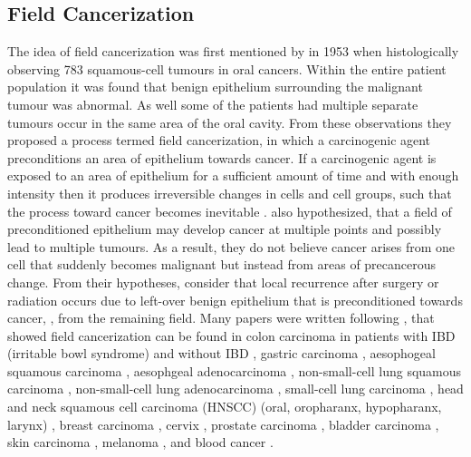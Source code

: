 \documentclass[\main/thesis.tex]{subfiles}
\begin{document}
 
\subsection{Field Cancerization}
 
The idea of field cancerization was first mentioned by \textcite{Slaughter} in 1953 when histologically observing 783 squamous-cell tumours in oral cancers. Within the entire patient population it was found that benign epithelium surrounding the malignant tumour was abnormal. As well some of the patients had multiple separate tumours occur in the same area of the oral cavity. From these observations they proposed a process termed field cancerization, in which a carcinogenic agent preconditions an area of epithelium towards cancer. If a carcinogenic agent is exposed to an area of epithelium for a sufficient amount of time and with enough intensity then it produces irreversible changes in cells and cell groups, such that the process toward cancer becomes inevitable \parencite{Slaughter}. \textcite{Slaughter} also hypothesized, that a field of preconditioned epithelium may develop cancer at multiple points and possibly lead to multiple tumours. As a result, they do not believe cancer arises from one cell that suddenly becomes malignant but instead from areas of precancerous change. From their hypotheses, \textcite{Slaughter} consider that local recurrence after surgery or radiation occurs due to left-over benign epithelium that is preconditioned towards cancer, \ie, from the remaining field. Many papers were written following \textcite{Slaughter}, that showed field cancerization can be found in colon carcinoma in patients with \parencite{Galandiuk,Leedham,Koizumi,VanDekken2006} IBD (irritable bowl syndrome) and without IBD \parencite{Alonso,Asada,Damania,Hawthorn,Kamiyama,Kaz,Milicic,Shen}, gastric carcinoma \parencite{GutierrezGonzalez,Kang,McDonald,Takeshima,Ushijima,Yamanoi,Zaky}, aesophogeal squamous carcinoma \parencite{Cense,Kammori,Lee,Matsuda,Oka,RoeschEly,Yakoub}, aesophgeal adenocarcinoma \parencite{Galipeau,Maley052004,Maley102004,VanDekken1999}, non-small-cell lung squamous carcinoma \parencite{Chang,Franklin,Kadara2012,McCaughan,Pipinikas,Sozzi,Steiling}, non-small-cell lung adenocarcinoma \parencite{Gomperts,Kadara2014,Lin,Nakachi,Weichert}, small-cell lung carcinoma \parencite{Gomperts,Kadara2014,Lin,Nakachi,Wirtschafter},  head and neck squamous cell carcinoma (HNSCC) (oral, oropharanx, hypopharanx,  larynx) \parencite{Slaughter,Braakhuis,Angadi,BoscoloRizzo,Califano1996,Narayana,Pentenero,Shaw,VanDerVorst}, breast carcinoma \parencite{Dworkin,Ellsworth,Foschini,Rivenbark,Trujillo2011}, cervix \parencite{Chu}, prostate carcinoma \parencite{Haaland,Nonn,Trujillo2012}, bladder carcinoma \parencite{Hafner,Vriesema,Wang}, skin carcinoma \parencite{Hu,Kanjilal,Stern,Szeimies,Vatve}, melanoma \parencite{Shain}, and blood cancer \parencite{Mori,MGreaves,Genovese}.
 
\end{document}
